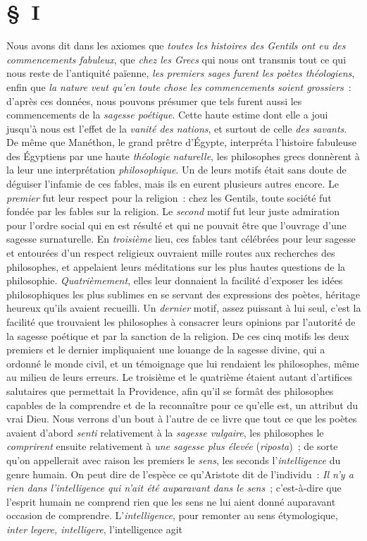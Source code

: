\documentclass[french,twoside]{book} %
\begin{document}
\section[{§ I}]{§ I}
\noindent  Nous avons dit dans les axiomes que {\itshape toutes les histoires des Gentils ont eu des commencements fabuleux}, que {\itshape chez les Grecs} qui nous ont transmis tout ce qui nous reste de l’antiquité païenne, {\itshape les premiers sages furent les poètes théologiens}, enfin que {\itshape la nature veut qu’en toute chose les commencements soient grossiers} : d’après ces données, nous pouvons présumer que tels furent aussi les commencements de la {\itshape sagesse poétique}. Cette haute estime dont elle a joui jusqu’à nous est l’effet de la {\itshape vanité des nations}, et surtout de celle {\itshape des savants}. De même que Manéthon, le grand prêtre d’Égypte, interpréta l’histoire fabuleuse des Égyptiens par une haute {\itshape théologie naturelle}, les philosophes grecs donnèrent à la leur une interprétation {\itshape philosophique}. Un  de leurs motifs était sans doute de déguiser l’infamie de ces fables, mais ils en eurent plusieurs autres encore. Le {\itshape premier} fut leur respect pour la religion : chez les Gentils, toute société fut fondée par les fables sur la religion. Le {\itshape second} motif fut leur juste admiration pour l’ordre social qui en est résulté et qui ne pouvait être que l’ouvrage d’une sagesse surnaturelle. En {\itshape troisième} lieu, ces fables tant célébrées pour leur sagesse et entourées d’un respect religieux ouvraient mille routes aux recherches des philosophes, et appelaient leurs méditations sur les plus hautes questions de la philosophie. {\itshape Quatrièmement}, elles leur donnaient la facilité d’exposer les idées philosophiques les plus sublimes en se servant des expressions des poètes, héritage heureux qu’ils avaient recueilli. Un {\itshape dernier} motif, assez puissant à lui seul, c’est la facilité que trouvaient les philosophes à consacrer leurs opinions par l’autorité de la sagesse poétique et par la sanction de la religion. De ces cinq motifs les deux premiers et le dernier impliquaient une louange de la sagesse divine, qui a ordonné le monde civil, et un témoignage que lui rendaient les philosophes, même au milieu de leurs erreurs. Le troisième et le quatrième étaient autant d’artifices salutaires que permettait la Providence, afin qu’il se formât des philosophes capables de la comprendre et de la reconnaître pour ce qu’elle est, un attribut du vrai Dieu. Nous verrons d’un bout à l’autre de ce livre que tout ce que les poètes avaient d’abord {\itshape senti}  relativement à la {\itshape sagesse vulgaire}, les philosophes le {\itshape comprirent} ensuite relativement à {\itshape une sagesse plus élevée} ({\itshape riposta}) ; de sorte qu’on appellerait avec raison les premiers le {\itshape sens}, les seconds l’{\itshape intelligence} du genre humain. On peut dire de l’espèce ce qu’Aristote dit de l’individu : {\itshape Il n’y a rien dans l’intelligence qui n’ait été auparavant dans le sens} ; c’est-à-dire que l’esprit humain ne comprend rien que les sens ne lui aient donné auparavant occasion de comprendre. L’{\itshape intelligence}, pour remonter au sens étymologique, {\itshape inter legere, intelligere}, l’intelligence agit 
\end{document}

